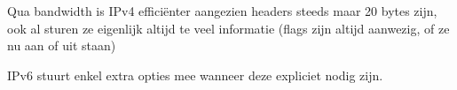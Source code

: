 Qua bandwidth is IPv4 efficiënter aangezien headers steeds maar 20 bytes zijn, ook al sturen ze eigenlijk altijd te veel informatie (flags zijn altijd aanwezig, of ze nu aan of uit staan)

IPv6 stuurt enkel extra opties mee wanneer deze expliciet nodig zijn.